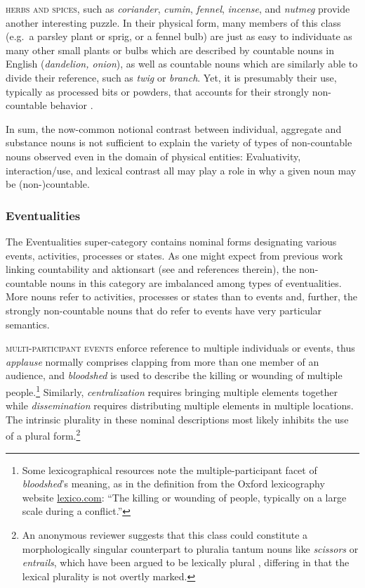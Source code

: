 \documentclass[output=paper]{langscibook}
\begin{document}


\textsc{herbs and spices}, such as \textit{coriander}, \textit{cumin}, \textit{fennel}, \textit{incense}, and \textit{nutmeg} provide another interesting puzzle.  In their physical form, many members of this class (e.g.\ a parsley plant or sprig, or a fennel bulb) are just as easy to individuate as many other small plants or bulbs which are described by countable  nouns in English (\textit{dandelion, onion}), as well as countable nouns which are similarly able to divide their reference, such as \textit{twig} or \textit{branch}.  Yet, it is presumably their use, typically as processed bits or powders, that accounts for their strongly non-countable behavior \citep{Wierzbicka1988}.

In sum, the now-common notional contrast between individual, aggregate and substance nouns is not sufficient to explain the variety of types of non-countable nouns observed even in the domain of physical entities: Evaluativity, interaction/use, and lexical contrast all may play a role in why a given noun may be (non-)countable.

\subsubsection{Eventualities} The Eventualities super-category contains nominal forms designating various events, activities, processes or states.  As one might expect from previous work linking countability and aktionsart (see \citealt{Mourelatos1978, grimm2014individuating} and references therein), the non-countable nouns in this category are imbalanced among types of eventualities. More nouns refer to activities, processes or states than to events and, further, the strongly non-countable nouns that do refer to events have very particular semantics.

\textsc{multi-participant events} enforce  reference to multiple individuals or events, thus \textit{applause} normally comprises clapping from more than one member of an audience, and \textit{bloodshed} is used to describe the killing or wounding of multiple people.\footnote{Some lexicographical resources note the multiple-participant facet of \textit{bloodshed}'s meaning, as in the definition from the Oxford lexicography website \url{lexico.com}: ``The killing or wounding of people, typically on a large scale during a conflict.''}  Similarly, \textit{centralization} requires bringing multiple elements together  while  
\textit{dissemination} requires distributing multiple elements in multiple locations.  The intrinsic plurality in these nominal descriptions most likely inhibits the use of a plural form.\footnote{An anonymous reviewer suggests that this class could constitute a morphologically singular counterpart to pluralia tantum nouns like \textit{scissors} or \textit{entrails}, which have been argued to be lexically plural \citep{Acquaviva2008}, differing in that the lexical plurality is not overtly marked.}
\end{document}
